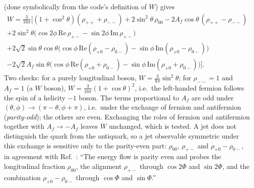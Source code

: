 (done symbolically from the code's definition of $W$) gives
\begin{multline}
  W = \frac{3}{16\pi}\Big[ (1+\cos^2\theta)(\rho_{++}+\rho_{--}) + 2\sin^2\theta\,\rho_{00}
  - 2A_f\cos\theta\,(\rho_{++}-\rho_{--}) \\
  + 2\sin^2\theta\big(\cos2\phi\,\mathrm{Re}\,\rho_{+-} - \sin2\phi\,\mathrm{Im}\,\rho_{+-}\big) \\
  + 2\sqrt2\sin\theta\cos\theta\big(\cos\phi\,\mathrm{Re}(\rho_{+0}-\rho_{0-}) - \sin\phi\,\mathrm{Im}(\rho_{+0}-\rho_{0-})\big) \\
  - 2\sqrt2 A_f \sin\theta\big(\cos\phi\,\mathrm{Re}(\rho_{+0}+\rho_{0-}) - \sin\phi\,\mathrm{Im}(\rho_{+0}+\rho_{0-})\big)\Big].
  \label{eq:app:Wexplicit}
\end{multline}
Two checks: for a purely longitudinal boson, $W = \tfrac{3}{8\pi}\sin^2\theta$; for $\rho_{--} = 1$ and $A_f = 1$ (a $W$
boson), $W = \tfrac{3}{16\pi}(1+\cos\theta)^2$, i.e.\ the left-handed fermion follows the spin of a helicity $-1$ boson.
The terms proportional to $A_f$ are odd under $(\theta,\phi) \to (\pi - \theta, \phi + \pi)$, i.e.\ under the exchange of
fermion and antifermion (\emph{parity-odd}); the others are even. Exchanging the roles of fermion and antifermion
together with $A_f \to -A_f$ leaves $W$ unchanged, which is tested. A jet does not distinguish the quark from the
antiquark, so a jet observable symmetric under this exchange is sensitive only to the parity-even part:
$\rho_{00}$, $\rho_{+-}$ and $\rho_{+0} - \rho_{0-}$, in agreement with Ref.~\cite[App.~D]{Gao:2026bvp}: ``The energy flow is
parity even and probes the longitudinal fraction $\rho_{00}$, the alignment $\rho_{+-}$ through $\cos 2\Phi$ and
$\sin 2\Phi$, and the combination $\rho_{+0}-\rho_{0-}$ through $\cos\Phi$ and $\sin\Phi$.''

